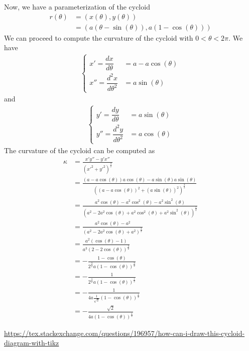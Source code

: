 \documentclass[a4paper]{report}
\begin{document}
\newpage
Now, we have a parameterization of the cycloid
\begin{align}
	r(\theta) &= \left(x(\theta), y(\theta)\right) \\
	&= \left( a\left(\theta - \sin(\theta)\right), a\left(1 - \cos(\theta)\right)\right)
\end{align}
We can proceed to compute the curvature of the cycloid with $0 < \theta < 2\pi$. We have
\begin{align}
\begin{cases}
x' = \dfrac{d x}{d \theta} &= a - a\cos(\theta)\\
x'' = \dfrac{d^2 x}{d \theta^2} &= a\sin(\theta)
\end{cases}
\end{align}
and
\begin{align}
\begin{cases}
y' = \dfrac{d y}{d \theta} &= a\sin(\theta)\\
y'' = \dfrac{d^2 y}{d \theta^2} &= a\cos(\theta)
\end{cases}
\end{align}
The curvature of the cycloid can be computed as
\begin{align}
	\kappa &= \frac{x'y'' - y'x''}{\left(x'^2 + y'^2\right)^{\frac{3}{2}}} \\
	&= \frac{(a - a\cos(\theta))a\cos(\theta) - a\sin(\theta)a\sin(\theta)}{\left((a - a\cos(\theta))^2 + (a\sin(\theta))^2\right)^{\frac{3}{2}}} \\
	&= \frac{a^2\cos(\theta) - a^2\cos^2(\theta) - a^2\sin^2(\theta)}{\left(a^2 -2a^2\cos(\theta) + a^2\cos^2(\theta) + a^2\sin^2(\theta)\right)^{\frac{3}{2}}} \\
	&= \frac{a^2\cos(\theta) - a^2}{\left(a^2 -2a^2\cos(\theta) + a^2\right)^{\frac{3}{2}}} \\
	&= \frac{a^2(\cos(\theta) - 1)}{a^3\left(2-2\cos(\theta)\right)^{\frac{3}{2}}} \\
	&= -\frac{1-\cos(\theta)}{2^{\frac{3}{2}}a\left(1-\cos(\theta)\right)^{\frac{3}{2}}} \\
	&= -\frac{1}{2^{\frac{3}{2}}a\left(1-\cos(\theta)\right)^{\frac{1}{2}}} \\
	&= -\frac{1}{4a\frac{1}{\sqrt{2}}\left(1-\cos(\theta)\right)^{\frac{1}{2}}} \\
	&= -\frac{\sqrt{2}}{4a\left(1-\cos(\theta)\right)^{\frac{1}{2}}}
\end{align}

\newpage
\printindex
\newpage
\begin{thebibliography}{999}
 \url{https://tex.stackexchange.com/questions/196957/how-can-i-draw-this-cycloid-diagram-with-tikz} 
\end{thebibliography}
\end{document}
